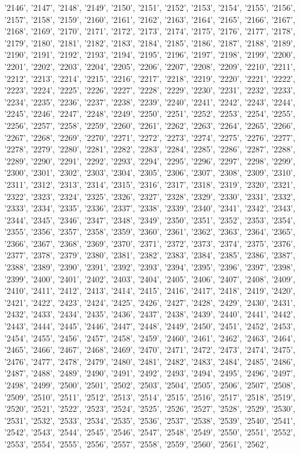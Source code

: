 '2146', '2147', '2148', '2149', '2150', '2151', '2152', '2153', '2154', '2155', '2156', '2157', '2158', '2159', '2160', '2161', '2162', '2163', '2164', '2165', '2166', '2167', '2168', '2169', '2170', '2171', '2172', '2173', '2174', '2175', '2176', '2177', '2178', '2179', '2180', '2181', '2182', '2183', '2184', '2185', '2186', '2187', '2188', '2189', '2190', '2191', '2192', '2193', '2194', '2195', '2196', '2197', '2198', '2199', '2200', '2201', '2202', '2203', '2204', '2205', '2206', '2207', '2208', '2209', '2210', '2211', '2212', '2213', '2214', '2215', '2216', '2217', '2218', '2219', '2220', '2221', '2222', '2223', '2224', '2225', '2226', '2227', '2228', '2229', '2230', '2231', '2232', '2233', '2234', '2235', '2236', '2237', '2238', '2239', '2240', '2241', '2242', '2243', '2244', '2245', '2246', '2247', '2248', '2249', '2250', '2251', '2252', '2253', '2254', '2255', '2256', '2257', '2258', '2259', '2260', '2261', '2262', '2263', '2264', '2265', '2266', '2267', '2268', '2269', '2270', '2271', '2272', '2273', '2274', '2275', '2276', '2277', '2278', '2279', '2280', '2281', '2282', '2283', '2284', '2285', '2286', '2287', '2288', '2289', '2290', '2291', '2292', '2293', '2294', '2295', '2296', '2297', '2298', '2299', '2300', '2301', '2302', '2303', '2304', '2305', '2306', '2307', '2308', '2309', '2310', '2311', '2312', '2313', '2314', '2315', '2316', '2317', '2318', '2319', '2320', '2321', '2322', '2323', '2324', '2325', '2326', '2327', '2328', '2329', '2330', '2331', '2332', '2333', '2334', '2335', '2336', '2337', '2338', '2339', '2340', '2341', '2342', '2343', '2344', '2345', '2346', '2347', '2348', '2349', '2350', '2351', '2352', '2353', '2354', '2355', '2356', '2357', '2358', '2359', '2360', '2361', '2362', '2363', '2364', '2365', '2366', '2367', '2368', '2369', '2370', '2371', '2372', '2373', '2374', '2375', '2376', '2377', '2378', '2379', '2380', '2381', '2382', '2383', '2384', '2385', '2386', '2387', '2388', '2389', '2390', '2391', '2392', '2393', '2394', '2395', '2396', '2397', '2398', '2399', '2400', '2401', '2402', '2403', '2404', '2405', '2406', '2407', '2408', '2409', '2410', '2411', '2412', '2413', '2414', '2415', '2416', '2417', '2418', '2419', '2420', '2421', '2422', '2423', '2424', '2425', '2426', '2427', '2428', '2429', '2430', '2431', '2432', '2433', '2434', '2435', '2436', '2437', '2438', '2439', '2440', '2441', '2442', '2443', '2444', '2445', '2446', '2447', '2448', '2449', '2450', '2451', '2452', '2453', '2454', '2455', '2456', '2457', '2458', '2459', '2460', '2461', '2462', '2463', '2464', '2465', '2466', '2467', '2468', '2469', '2470', '2471', '2472', '2473', '2474', '2475', '2476', '2477', '2478', '2479', '2480', '2481', '2482', '2483', '2484', '2485', '2486', '2487', '2488', '2489', '2490', '2491', '2492', '2493', '2494', '2495', '2496', '2497', '2498', '2499', '2500', '2501', '2502', '2503', '2504', '2505', '2506', '2507', '2508', '2509', '2510', '2511', '2512', '2513', '2514', '2515', '2516', '2517', '2518', '2519', '2520', '2521', '2522', '2523', '2524', '2525', '2526', '2527', '2528', '2529', '2530', '2531', '2532', '2533', '2534', '2535', '2536', '2537', '2538', '2539', '2540', '2541', '2542', '2543', '2544', '2545', '2546', '2547', '2548', '2549', '2550', '2551', '2552', '2553', '2554', '2555', '2556', '2557', '2558', '2559', '2560', '2561', '2562', 